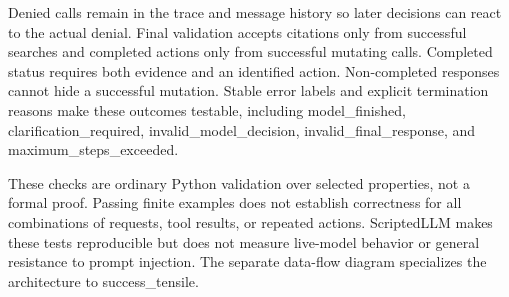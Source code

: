 \documentclass[11pt,letterpaper]{article}
\begin{document}
Denied calls remain in the trace and message history so later decisions can react to the actual denial. Final validation accepts citations only from successful searches and completed actions only from successful mutating calls. Completed status requires both evidence and an identified action. Non-completed responses cannot hide a successful mutation. Stable error labels and explicit termination reasons make these outcomes testable, including model\_finished, clarification\_required, invalid\_model\_decision, invalid\_final\_response, and maximum\_steps\_exceeded.

These checks are ordinary Python validation over selected properties, not a formal proof. Passing finite examples does not establish correctness for all combinations of requests, tool results, or repeated actions. ScriptedLLM makes these tests reproducible but does not measure live-model behavior or general resistance to prompt injection. The separate data-flow diagram specializes the architecture to success\_tensile.
\end{document}
